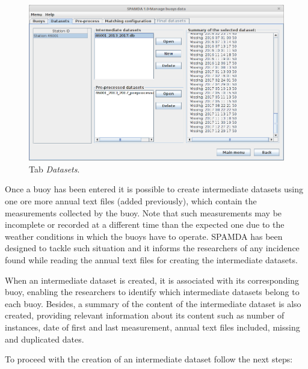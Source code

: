 \begin{onehalfspace}
				\begin{figure}[ht!]
					\centering
					\includegraphics[scale=0.40]{figures/tabDatasets.png}
					\caption{Tab \textit{Datasets}.}
					\label{fig:tabDatasets}
				\end{figure}
			
				Once a buoy has been entered it is possible to create intermediate datasets using one ore more annual text files (added previously), which contain the measurements collected by the buoy. Note that such measurements may be incomplete or recorded at a different time than the expected one due to the weather conditions in which the buoys have to operate. SPAMDA has been designed to tackle such situation and it informs the researchers of any incidence found while reading the annual text files for creating the intermediate datasets.
				
				When an intermediate dataset is created, it is associated with its corresponding buoy, enabling the researchers to identify which intermediate datasets belong to each buoy. Besides, a summary of the content of the intermediate dataset is also created, providing relevant information about its content such as number of instances, date of first and last measurement, annual text files included, missing and duplicated dates.
				
				To proceed with the creation of an intermediate dataset follow the next steps:
				

\end{onehalfspace}
